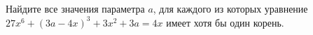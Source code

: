 \begin{ex}
	\begin{condition}
		Найдите все значения параметра \( a \), для каждого из которых уравнение \( 27x^6+(3a-4x)^3+3x^2+3a=4x \) имеет хотя бы один корень.
	\end{condition}
\end{ex}